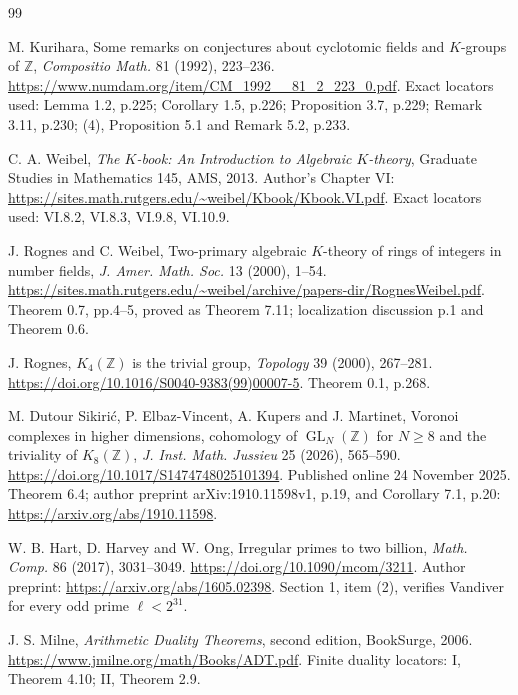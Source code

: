 \documentclass[11pt,a4paper]{article}
\theoremstyle{definition}
\begin{document}
\begin{thebibliography}{99}

M. Kurihara,
Some remarks on conjectures about cyclotomic fields and \(K\)-groups of \(\mathbb Z\),
\emph{Compositio Math.} 81 (1992), 223--236.
\url{https://www.numdam.org/item/CM_1992__81_2_223_0.pdf}.
Exact locators used: Lemma 1.2, p.225; Corollary 1.5, p.226;
Proposition 3.7, p.229; Remark 3.11, p.230;
(4), Proposition 5.1 and Remark 5.2, p.233.


C. A. Weibel,
\emph{The \(K\)-book: An Introduction to Algebraic \(K\)-theory},
Graduate Studies in Mathematics 145, AMS, 2013.
Author's Chapter VI:
\url{https://sites.math.rutgers.edu/~weibel/Kbook/Kbook.VI.pdf}.
Exact locators used: VI.8.2, VI.8.3, VI.9.8, VI.10.9.


J. Rognes and C. Weibel,
Two-primary algebraic \(K\)-theory of rings of integers in number fields,
\emph{J. Amer. Math. Soc.} 13 (2000), 1--54.
\url{https://sites.math.rutgers.edu/~weibel/archive/papers-dir/RognesWeibel.pdf}.
Theorem 0.7, pp.4--5, proved as Theorem 7.11;
localization discussion p.1 and Theorem 0.6.


J. Rognes, \(K_4(\mathbb Z)\) is the trivial group,
\emph{Topology} 39 (2000), 267--281.
\url{https://doi.org/10.1016/S0040-9383(99)00007-5}.
Theorem 0.1, p.268.


M. Dutour Sikiri\'c, P. Elbaz-Vincent, A. Kupers and J. Martinet,
Voronoi complexes in higher dimensions, cohomology of
\(\operatorname{GL}_N(\mathbb Z)\) for \(N\ge8\) and the triviality of
\(K_8(\mathbb Z)\),
\emph{J. Inst. Math. Jussieu} 25 (2026), 565--590.
\url{https://doi.org/10.1017/S1474748025101394}.
Published online 24 November 2025.
Theorem 6.4; author preprint arXiv:1910.11598v1, p.19,
and Corollary 7.1, p.20:
\url{https://arxiv.org/abs/1910.11598}.


W. B. Hart, D. Harvey and W. Ong,
Irregular primes to two billion,
\emph{Math. Comp.} 86 (2017), 3031--3049.
\url{https://doi.org/10.1090/mcom/3211}.
Author preprint:
\url{https://arxiv.org/abs/1605.02398}.
Section 1, item (2), verifies Vandiver for every odd prime
\(\ell<2^{31}\).


J. S. Milne, \emph{Arithmetic Duality Theorems},
second edition, BookSurge, 2006.
\url{https://www.jmilne.org/math/Books/ADT.pdf}.
Finite duality locators: I, Theorem 4.10; II, Theorem 2.9.



\end{thebibliography}
\end{document}

